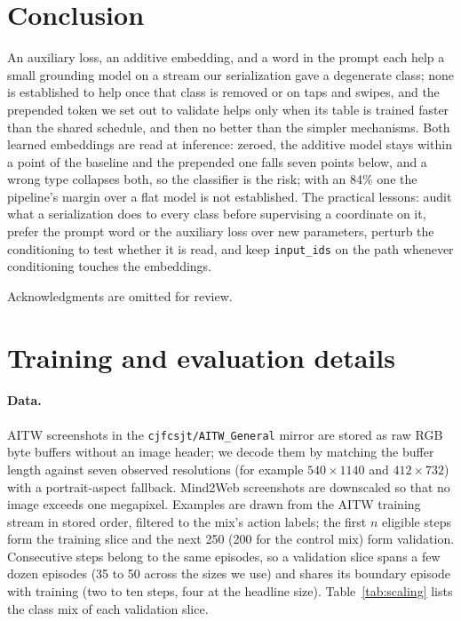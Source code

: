 \documentclass{article}
\begin{document}
\section{Conclusion}
\label{sec:conclusion}
An auxiliary loss, an additive embedding, and a word in the prompt each help a small grounding model on a stream our serialization gave a degenerate class; none is established to help once that class is removed or on taps and swipes, and the prepended token we set out to validate helps only when its table is trained faster than the shared schedule, and then no better than the simpler mechanisms. Both learned embeddings are read at inference: zeroed, the additive model stays within a point of the baseline and the prepended one falls seven points below, and a wrong type collapses both, so the classifier is the risk; with an 84\% one the pipeline's margin over a flat model is not established. The practical lessons: audit what a serialization does to every class before supervising a coordinate on it, prefer the prompt word or the auxiliary loss over new parameters, perturb the conditioning to test whether it is read, and keep \texttt{input\_ids} on the path whenever conditioning touches the embeddings.

\begin{ack}
Acknowledgments are omitted for review.
\end{ack}




\clearpage
\appendix

\section{Training and evaluation details}
\label{app:details}
\paragraph{Data.} AITW screenshots in the \texttt{cjfcsjt/AITW\_General} mirror are stored as raw RGB byte buffers without an image header; we decode them by matching the buffer length against seven observed resolutions (for example $540\times1140$ and $412\times732$) with a portrait-aspect fallback. Mind2Web screenshots are downscaled so that no image exceeds one megapixel. Examples are drawn from the AITW training stream in stored order, filtered to the mix's action labels; the first $n$ eligible steps form the training slice and the next 250 (200 for the control mix) form validation. Consecutive steps belong to the same episodes, so a validation slice spans a few dozen episodes (35 to 50 across the sizes we use) and shares its boundary episode with training (two to ten steps, four at the headline size). Table~\ref{tab:scaling} lists the class mix of each validation slice.
\end{document}
